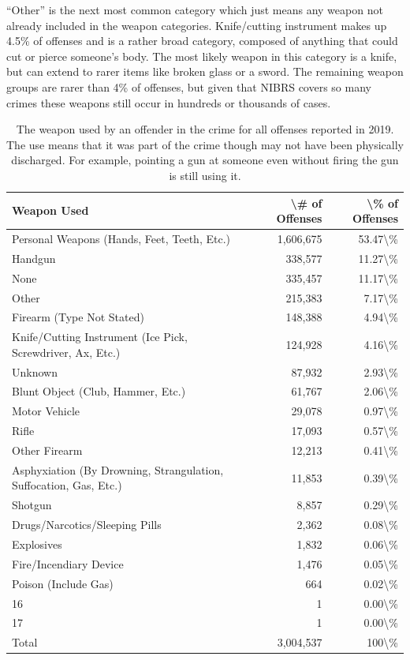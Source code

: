 \documentclass[
  12pt,
  openany]{book}
\begin{document}
``Other'' is the next most common category which just means any weapon not already included in the weapon categories. Knife/cutting instrument makes up 4.5\% of offenses and is a rather broad category, composed of anything that could cut or pierce someone's body. The most likely weapon in this category is a knife, but can extend to rarer items like broken glass or a sword. The remaining weapon groups are rarer than 4\% of offenses, but given that NIBRS covers so many crimes these weapons still occur in hundreds or thousands of cases.

\begin{longtable}[t]{lrr}
\caption{\label{tab:offenseWeapon}The weapon used by an offender in the crime for all offenses reported in 2019. The use means that it was part of the crime though may not have been physically discharged. For example, pointing a gun at someone even without firing the gun is still using it.}\\
\toprule
Weapon Used & \textbackslash{}\# of Offenses & \textbackslash{}\% of Offenses\\
\midrule
Personal Weapons (Hands, Feet, Teeth, Etc.) & 1,606,675 & 53.47\textbackslash{}\%\\
Handgun & 338,577 & 11.27\textbackslash{}\%\\
None & 335,457 & 11.17\textbackslash{}\%\\
Other & 215,383 & 7.17\textbackslash{}\%\\
Firearm (Type Not Stated) & 148,388 & 4.94\textbackslash{}\%\\
\addlinespace
Knife/Cutting Instrument (Ice Pick, Screwdriver, Ax, Etc.) & 124,928 & 4.16\textbackslash{}\%\\
Unknown & 87,932 & 2.93\textbackslash{}\%\\
Blunt Object (Club, Hammer, Etc.) & 61,767 & 2.06\textbackslash{}\%\\
Motor Vehicle & 29,078 & 0.97\textbackslash{}\%\\
Rifle & 17,093 & 0.57\textbackslash{}\%\\
\addlinespace
Other Firearm & 12,213 & 0.41\textbackslash{}\%\\
Asphyxiation (By Drowning, Strangulation, Suffocation, Gas, Etc.) & 11,853 & 0.39\textbackslash{}\%\\
Shotgun & 8,857 & 0.29\textbackslash{}\%\\
Drugs/Narcotics/Sleeping Pills & 2,362 & 0.08\textbackslash{}\%\\
Explosives & 1,832 & 0.06\textbackslash{}\%\\
\addlinespace
Fire/Incendiary Device & 1,476 & 0.05\textbackslash{}\%\\
Poison (Include Gas) & 664 & 0.02\textbackslash{}\%\\
16 & 1 & 0.00\textbackslash{}\%\\
17 & 1 & 0.00\textbackslash{}\%\\
Total & 3,004,537 & 100\textbackslash{}\%\\
\bottomrule
\end{longtable}
\end{document}
